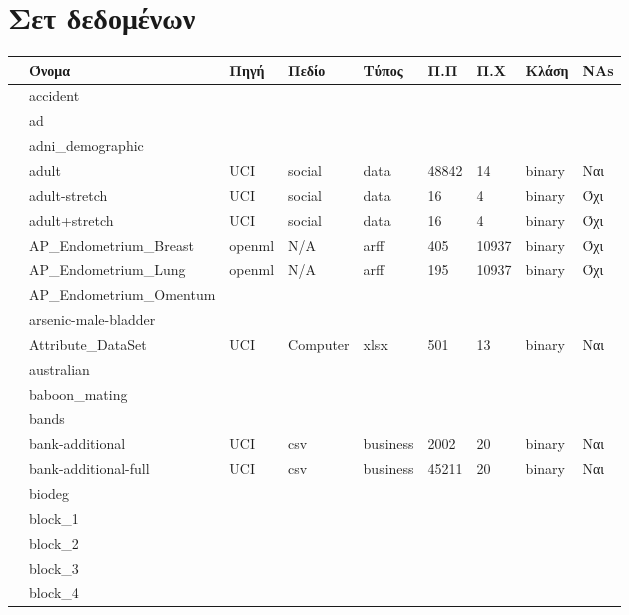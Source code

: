\chapter{Σετ δεδομένων }
\label{appendix:Datasets}
{ \footnotesize
	 	\begin{longtable}{|l| l| l | l | l | l |l | l | l | } 
 			\hline
 			 & Όνομα & Πηγή & Πεδίο & Τύπος & { Π.Π} & {Π.Χ} & Κλάση & NAs \\
 			\hline 
 			\rownumber  & accident & & & & & & &\\
 			\rownumber & ad & & & & & & &\\
 			\rownumber & adni\_demographic & & & & & & &\\
 			\rownumber &  adult \citep{census}  & UCI & social & data  & 48842 & 14 & binary & Ναι\\
 			\rownumber &  adult-stretch \citep{balloons} & UCI & social & data & 16 & 4 & binary & Όχι\\
 			\rownumber &  adult+stretch \citep{balloons} & UCI & social & data & 16 & 4 & binary & Όχι\\
 			\rownumber &  AP\_Endometrium\_Breast \citep{breast} & openml & N/A & arff & 405 & 10937 & binary & Όχι\\
 			\rownumber & AP\_Endometrium\_Lung \citep{lung} & openml & N/A & arff  & 195 & 10937 & binary  & Όχι\\
 			\rownumber &  AP\_Endometrium\_Omentum & & & & & & & \\
 			\rownumber & arsenic-male-bladder & & & & & & &\\
 			\rownumber & Attribute\_DataSet & UCI & Computer & xlsx & 501 & 13 & binary  & Ναι \\
 			\rownumber & australian & & & & & & & \\
 		\rownumber & baboon\_mating & & & & & & &\\
 			\rownumber &  bands & & & & & & &\\
 			\rownumber & bank-additional & UCI & csv & business & 2002 & 20 & binary & Ναι \\
 		\rownumber &  bank-additional-full & UCI & csv& business & 45211& 20& binary& Ναι \\
 			\rownumber &  biodeg & & & & & & & \\
 			\rownumber & block\_1 & & & & & & & \\
 			\rownumber & block\_2 & & & & & & & \\
 			\rownumber & block\_3 & & & & & & & \\
 			\rownumber & block\_4 & & & & & & & \\

\end{longtable}}
